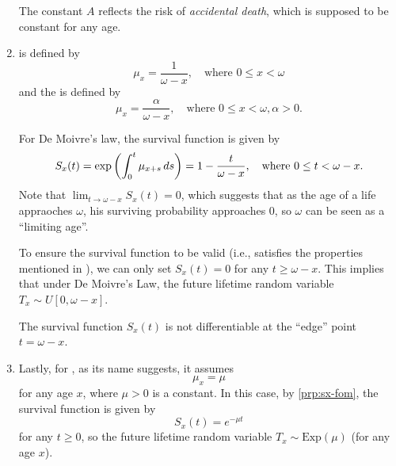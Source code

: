 \begin{enumerate}
The constant \(A\) reflects the risk of \emph{accidental death}, which is
supposed to be constant for any age.

\item {} is defined by
\[
\mu_x=\frac{1}{\omega-x}, \quad\text{where }0\le x<\omega
\]
and the  is defined by
\[
\mu_x=\frac{\alpha}{\omega-x}, \quad\text{where }0\le x<\omega, \alpha>0.
\]


For De Moivre's law, the survival function is given by
\[
S_x(t)=\exp\qty(\int_{0}^{t}\mu_{x+s}\,ds)
=1-\frac{t}{\omega-x},\quad\text{where }0 \le t<\omega-x.
\]
Note that \(\lim_{t\to \omega-x}S_x(t)=0\), which suggests that as the age of a
life appraoches \(\omega\), his surviving probability approaches 0, so
\(\omega\) can be seen as a ``limiting age''.

To ensure the survival function to be valid (i.e., satisfies the properties
mentioned in ), we can only set \(S_x(t)=0\) for any
\(t\ge \omega-x\). This implies that under De Moivre's Law, the future lifetime
random variable \(T_x\sim U[0,\omega-x]\).

\begin{note}
The survival function \(S_x(t)\) is not differentiable at the
``edge'' point \(t=\omega-x\).

\end{note}

\item Lastly, for , as its name suggests, it assumes
\[
\mu_x=\mu
\]
for any age \(x\), where \(\mu>0\) is a constant.
In this case, by \cref{prp:sx-fom}, the survival function is given by
\[
S_x(t)=e^{-\mu t}
\]
for any \(t\ge 0\), so the future lifetime random variable
\(T_x\sim\mathrm{Exp}(\mu)\) (for any age \(x\)).
\end{enumerate}
